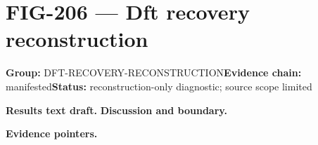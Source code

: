 \clearpage
\section{FIG-206 --- Dft recovery reconstruction}
\label{figpage:fig-206}
\textbf{Group:} DFT-RECOVERY-RECONSTRUCTION\quad \textbf{Evidence chain:} manifested\quad \textbf{Status:} reconstruction-only diagnostic; source scope limited

\textbf{Results text draft.} 
\textbf{Discussion and boundary.} 


\textbf{Evidence pointers.}



\vfill

